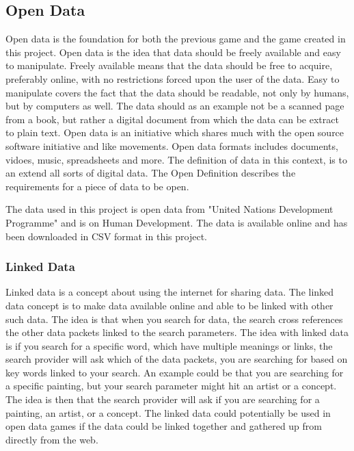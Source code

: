 \documentclass[a4paper,11pt]{article}
\begin{document}
\subsection{Open Data}
Open data is the foundation for both the previous game and the game created in this project. Open data is the idea that data should be freely available and easy to manipulate. Freely available means that the data should be free to acquire, preferably online, with no restrictions forced upon the user of the data. Easy to manipulate covers the fact that the data should be readable, not only by humans, but by computers as well. The data should as an example not be a scanned page from a book, but rather a digital document from which the data can be extract to plain text. Open data is an initiative which shares much with the open source software initiative and like movements\cite{opendatawiki}. Open data formats includes documents, vidoes, music, spreadsheets and more. The definition of data in this context, is to an extend all sorts of digital data. The Open Definition describes the requirements for a piece of data to be open\cite{opendefinition}.

The data used in this project is open data from "United Nations Development Programme"\cite{undpMain} and is on Human Development. The data is available online and has been downloaded in CSV format in this project.
\subsubsection{Linked Data}
Linked data is a concept about using the internet for sharing data. The linked data concept is to make data available online and able to be linked with other such data. The idea is that when you search for data, the search cross references the other data packets linked to the search parameters. The idea with linked data is if you search for a specific word, which have multiple meanings or links, the search provider will ask which of the data packets, you are searching for based on key words linked to your search. An example could be that you are searching for a specific painting, but your search parameter might hit an artist or a concept. The idea is then that the search provider will ask if you are searching for a painting, an artist, or a concept. The linked data could potentially be used in open data games if the data could be linked together and gathered up from directly from the web. 
\end{document}
